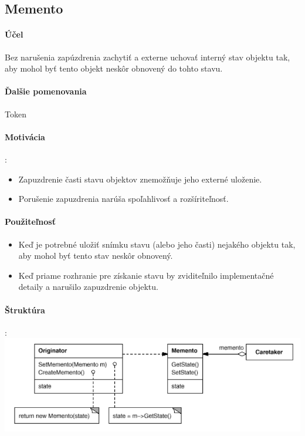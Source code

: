 	\subsection{Memento}
		\paragraph{Účel}
			Bez narušenia zapúzdrenia zachytiť a externe uchovať interný stav objektu tak, aby mohol byť tento objekt neskôr obnovený do tohto stavu.

		\paragraph{Ďalšie pomenovania}
			Token

		\paragraph{Motivácia}:\\
			\begin{itemize}
				\item Zapuzdrenie časti stavu objektov znemožňuje jeho externé uloženie.
				\item Porušenie zapuzdrenia narúša spoľahlivosť a rozšíriteľnosť.
			\end{itemize}
		\paragraph{Použiteľnosť}
			\begin{itemize}
				\item Keď je potrebné uložiť snímku stavu (alebo jeho časti) nejakého objektu tak, aby mohol byť tento stav neskôr obnovený.
				\item Keď priame rozhranie pre získanie stavu by zviditeľnilo implementačné detaily a narušilo zapuzdrenie objektu.
			\end{itemize}
		\paragraph{Štruktúra}:\\
			\includegraphics[width=.9\textwidth]{images/programovanie/memento1}

